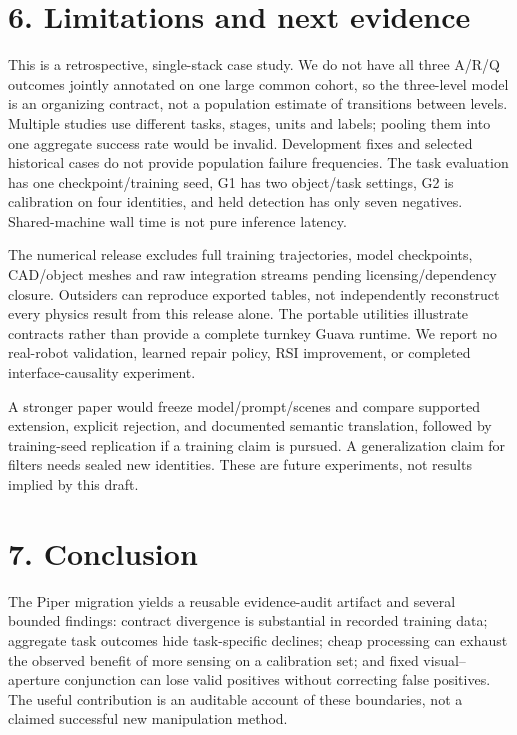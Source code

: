 \documentclass[10pt]{article}
\begin{document}
\section*{6. Limitations and next evidence}

This is a retrospective, single-stack case study. We do not have all three A/R/Q outcomes jointly annotated on one large common cohort, so the three-level model is an organizing contract, not a population estimate of transitions between levels. Multiple studies use different tasks, stages, units and labels; pooling them into one aggregate success rate would be invalid. Development fixes and selected historical cases do not provide population failure frequencies. The task evaluation has one checkpoint/training seed, G1 has two object/task settings, G2 is calibration on four identities, and held detection has only seven negatives. Shared-machine wall time is not pure inference latency.

The numerical release excludes full training trajectories, model checkpoints, CAD/object meshes and raw integration streams pending licensing/dependency closure. Outsiders can reproduce exported tables, not independently reconstruct every physics result from this release alone. The portable utilities illustrate contracts rather than provide a complete turnkey Guava runtime. We report no real-robot validation, learned repair policy, RSI improvement, or completed interface-causality experiment.

A stronger paper would freeze model/prompt/scenes and compare supported extension, explicit rejection, and documented semantic translation, followed by training-seed replication if a training claim is pursued. A generalization claim for filters needs sealed new identities. These are future experiments, not results implied by this draft.

\section*{7. Conclusion}

The Piper migration yields a reusable evidence-audit artifact and several bounded findings: contract divergence is substantial in recorded training data; aggregate task outcomes hide task-specific declines; cheap processing can exhaust the observed benefit of more sensing on a calibration set; and fixed visual--aperture conjunction can lose valid positives without correcting false positives. The useful contribution is an auditable account of these boundaries, not a claimed successful new manipulation method.
\end{document}
